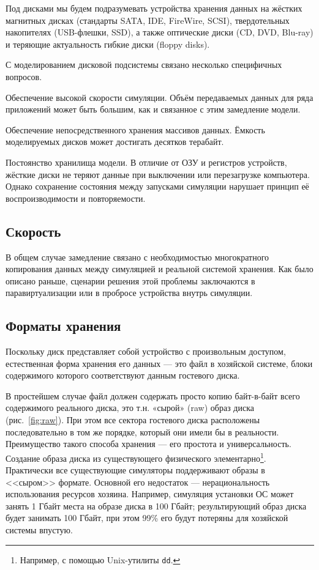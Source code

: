 Под дисками мы будем подразумевать устройства хранения данных на жёстких магнитных дисках (стандарты SATA, IDE, FireWire, SCSI), твердотельных накопителях (USB-флешки, SSD), а также оптические диски (CD, DVD, Blu-ray) и теряющие актуальность гибкие диски (\abbr floppy disks).

С моделированием дисковой подсистемы связано несколько специфичных вопросов.

\begin{itemize*}
\item Обеспечение высокой скорости симуляции. Объём передаваемых данных для ряда приложений может быть большим, как и связанное с этим замедление модели.

\item Обеспечение непосредственного хранения массивов данных. Ёмкость моделируемых дисков может достигать десятков терабайт.
\item Постоянство хранилища модели. В отличие от ОЗУ и регистров устройств, жёсткие диски не теряют данные при выключении или перезагрузке компьютера. Однако сохранение состояния между запусками симуляции нарушает принцип её воспроизводимости и повторяемости.
\end{itemize*}

\subsection{Скорость}

В общем случае замедление связано с необходимостью многократного копирования данных между симуляцией и реальной системой хранения. Как было описано раньше, сценарии решения этой проблемы заключаются в паравиртуализации или в пробросе устройства внутрь симуляции.

\subsection{Форматы хранения}

Поскольку диск представляет собой устройство с произвольным доступом, естественная форма хранения его данных --- это файл в хозяйской системе, блоки содержимого которого соответствуют данным гостевого диска.

В простейшем случае файл должен содержать просто копию байт-в-байт всего содержимого реального диска, это т.н. «сырой» (\abbr raw) образ диска (рис.~\ref{fig:raw}). При этом все сектора гостевого диска расположены последовательно в том же порядке, который они имели бы  в реальности. Преимущество такого способа хранения --- его простота и универсальность. Создание образа диска из существующего физического элементарно\footnote{Например, с помощью Unix-утилиты \texttt{dd}.}. Практически все существующие симуляторы поддерживают образы в <<сыром>> формате. Основной его недостаток --- нерациональность использования ресурсов хозяина. Например, симуляция установки ОС может занять 1 Гбайт места на образе диска в 100 Гбайт; результирующий образ диска будет занимать 100 Гбайт, при этом 99\% его будут потеряны для хозяйской системы впустую.

